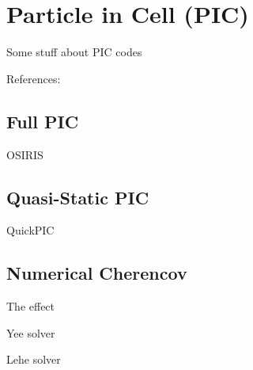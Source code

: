 %
%

\chapter{Particle in Cell (PIC)}
\label{Apx:PIC}

Some stuff about PIC codes

References: \cite{hatzky:2010,vay:2016}


\section{Full PIC}
\label{PIC:Full}
OSIRIS \cite{fonseca:2002, add:fonseca:2017}


\section{Quasi-Static PIC}
\label{PIC:QS}
QuickPIC \cite{an:2013, huang:2006}


\section{Numerical Cherencov}
\label{PIC:NumCher}

The effect \cite{godfrey:1974, greenwood:2004}

Yee solver \cite{yee:1966}

Lehe solver \cite{lehe:2013}
